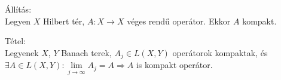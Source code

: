 \documentclass[12pt,a4paper]{scrartcl}
\newenvironment{tetel}{}{}
\newenvironment{allitas}{}{}
\begin{document}
\begin{allitas}

Állítás:\\
Legyen \(X\) Hilbert tér, \(\left. A:X\rightarrow X \right.\) véges
rendű operátor. Ekkor \(A\) kompakt.

\end{allitas}

\begin{tetel}

Tétel:\\
Legyenek \(X\), \(Y\) Banach terek, \(A_{j} \in L\left( {X,Y} \right)\)
operátorok kompaktak, és
\(\left. \exists A \in L\left( {X,Y} \right):\lim\limits_{j\rightarrow\infty}A_{j} = A\Rightarrow A \right.\)
is kompakt operátor.

\end{tetel}
\end{document}
